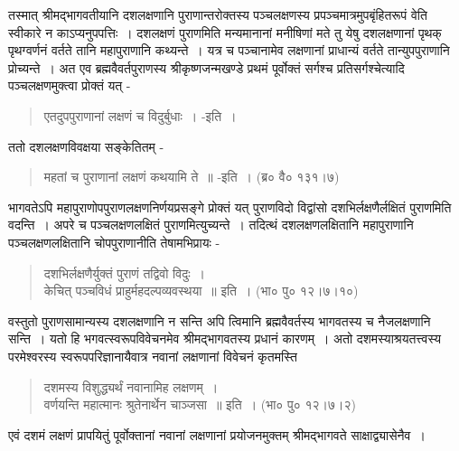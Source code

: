 तस्मात् श्रीमद्भागवतीयानि दशलक्षणानि पुराणान्तरोक्तस्य पञ्चलक्षणस्य प्रपञ्चमात्रमुपबृंहितरूपं वेति स्वीकारे न काऽप्यनुपपत्तिः~। दशलक्षणं पुराणमिति मन्यमानानां मनीषिणां मते तु येषु दशलक्षणानां पृथक् पृथग्वर्णनं वर्तते तानि महापुराणानि कथ्यन्ते~। यत्र च पञ्चानामेव लक्षणानां प्राधान्यं वर्तते तान्युपपुराणानि प्रोच्यन्ते~। अत एव ब्रह्मवैवर्तपुराणस्य श्रीकृष्णजन्मखण्डे प्रथमं पूर्वोक्तं सर्गश्च प्रतिसर्गश्चेत्यादि पञ्चलक्षणमुक्त्वा प्रोक्तं यत् -
\begin{verse}
एतदुपपुराणानां लक्षणं च विदुर्बुधाः~। -इति~।
\end{verse}
ततो दशलक्षणविवक्षया सङ्केतितम् -
\begin{verse}
महतां च पुराणानां लक्षणं कथयामि ते~॥ -इति~। (ब्र० वै० १३१।७)
\end{verse}
भागवतेऽपि महापुराणोपपुराणलक्षणनिर्णयप्रसङ्गे प्रोक्तं यत् पुराणविदो विद्वांसो दशभिर्लक्षणैर्लक्षितं पुराणमिति वदन्ति~। अपरे च पञ्चलक्षणलक्षितं पुराणमित्युच्यन्ते~। तदित्थं दशलक्षणलक्षितानि महापुराणानि पञ्चलक्षणलक्षितानि चोपपुराणानीति तेषामभिप्रायः -
\begin{verse}
दशभिर्लक्षणैर्युक्तं पुराणं तद्विवो विदुः~।\\
केचित् पञ्चविधं प्राहुर्महदल्पव्यवस्थया~॥ इति~। (भा० पु० १२।७।१०)
\end{verse}
वस्तुतो पुराणसामान्यस्य दशलक्षणानि न सन्ति अपि त्विमानि ब्रह्मवैवर्तस्य भागवतस्य च नैजलक्षणानि सन्ति~। यतो हि भगवत्स्वरूपविवेचनमेव श्रीमद्भागवतस्य प्रधानं कारणम्~। अतो दशमस्याश्रयतत्त्वस्य परमेश्वरस्य स्वरूपपरिज्ञानायैवात्र नवानां लक्षणानां विवेचनं कृतमस्ति 
\begin{verse}
दशमस्य विशुद्ध्यर्थं नवानामिह लक्षणम्~।\\
वर्णयन्ति महात्मानः श्रुतेनार्थेन चाञ्जसा~॥ इति~। (भा० पु० १२।७।२)
\end{verse}
एवं दशमं लक्षणं प्रापयितुं पूर्वोक्तानां नवानां लक्षणानां प्रयोजनमुक्तम् श्रीमद्भागवते साक्षाद्व्यासेनैव~।

\articleend
